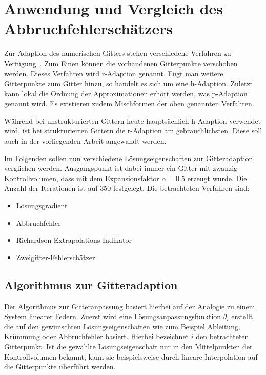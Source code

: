 \chapter{Anwendung und Vergleich des Abbruchfehlerschätzers}

Zur Adaption des numerischen Gitters stehen verschiedene Verfahren zu Verfügung~\cite{roy2}.
Zum Einen können die vorhandenen Gitterpunkte verschoben werden. Dieses Verfahren wird r-Adaption
genannt. Fügt man weitere Gitterpunkte zum Gitter hinzu, so handelt es sich um eine h-Adaption.
Zuletzt kann lokal die Ordnung der Approximationen erhört werden, was p-Adaption genannt wird.
Es existieren zudem Mischformen der oben genannten Verfahren.

Während bei unstrukturierten Gittern heute hauptsächlich h-Adaption verwendet wird, ist bei
strukturierten Gittern die r-Adaption am gebräuchlichsten. Diese soll auch in der vorliegenden
Arbeit angewandt werden.

Im Folgenden sollen nun verschiedene Lösungseigenschaften zur Gitteradaption verglichen werden.
Ausgangspunkt ist dabei immer ein Gitter mit zwanzig Kontrollvolumen, dass mit dem
Expansionsfaktor $\alpha=0.5$ erzeugt wurde. Die Anzahl der Iterationen ist auf 350 festgelegt.
Die betrachteten Verfahren sind:
\begin{itemize}
  \item Lösungsgradient
  \item Abbruchfehler
  \item Richardson-Extrapolations-Indikator
  \item Zweigitter-Fehlerschätzer
\end{itemize}




\section{Algorithmus zur Gitteradaption}

Der Algorithmus zur Gitteranpassung basiert hierbei auf der Analogie zu einem System
linearer Federn.
Zuerst wird eine Lösungsanpassungsfunktion $\theta_i$ erstellt, die auf den gewünschten
Lösungseigenschaften wie zum Beispiel Ableitung, Krümmung oder Abbruchfehler basiert. Hierbei
bezeichnet $i$ den betrachteten Gitterpunkt. Ist die gewählte Lösungseigenschaft nur in den
Mittelpunkten der Kontrollvolumen bekannt, kann sie beispielsweise durch lineare Interpolation
auf die Gitterpunkte überführt werden.

